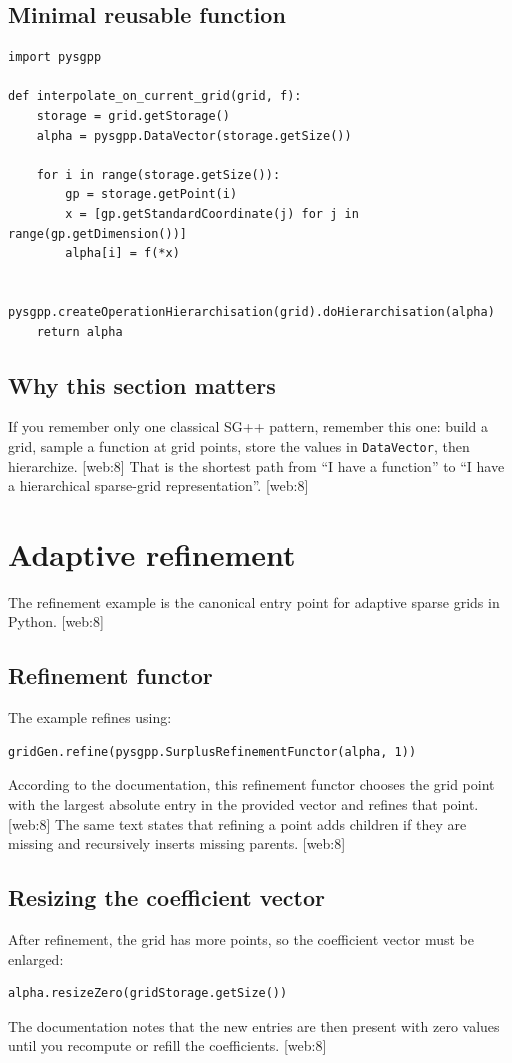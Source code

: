 \documentclass[11pt,a4paper]{article}
\begin{document}
\subsection{Minimal reusable function}
\begin{lstlisting}[style=py]
import pysgpp

def interpolate_on_current_grid(grid, f):
    storage = grid.getStorage()
    alpha = pysgpp.DataVector(storage.getSize())

    for i in range(storage.getSize()):
        gp = storage.getPoint(i)
        x = [gp.getStandardCoordinate(j) for j in range(gp.getDimension())]
        alpha[i] = f(*x)

    pysgpp.createOperationHierarchisation(grid).doHierarchisation(alpha)
    return alpha
\end{lstlisting}

\subsection{Why this section matters}
If you remember only one classical SG++ pattern, remember this one: build a grid, sample a function at grid points, store the values in \texttt{DataVector}, then hierarchize. [web:8]  
That is the shortest path from ``I have a function'' to ``I have a hierarchical sparse-grid representation''. [web:8]  

\section{Adaptive refinement}

The refinement example is the canonical entry point for adaptive sparse grids in Python. [web:8]

\subsection{Refinement functor}
The example refines using:
\begin{lstlisting}[style=py]
gridGen.refine(pysgpp.SurplusRefinementFunctor(alpha, 1))
\end{lstlisting}
According to the documentation, this refinement functor chooses the grid point with the largest absolute entry in the provided vector and refines that point. [web:8]  
The same text states that refining a point adds children if they are missing and recursively inserts missing parents. [web:8]  

\subsection{Resizing the coefficient vector}
After refinement, the grid has more points, so the coefficient vector must be enlarged:
\begin{lstlisting}[style=py]
alpha.resizeZero(gridStorage.getSize())
\end{lstlisting}
The documentation notes that the new entries are then present with zero values until you recompute or refill the coefficients. [web:8]  
\end{document}
